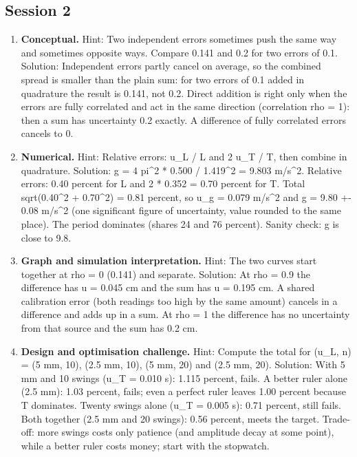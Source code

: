 \documentclass[11pt,a4paper]{article}
\begin{document}
\subsection*{Session 2}
\begin{enumerate}[nosep]
\item \textbf{Conceptual.} Hint: Two independent errors sometimes push the same way and sometimes opposite ways. Compare 0.141 and 0.2 for two errors of 0.1. Solution: Independent errors partly cancel on average, so the combined spread is smaller than the plain sum: for two errors of 0.1 added in quadrature the result is 0.141, not 0.2. Direct addition is right only when the errors are fully correlated and act in the same direction (correlation rho = 1): then a sum has uncertainty 0.2 exactly. A difference of fully correlated errors cancels to 0.
\item \textbf{Numerical.} Hint: Relative errors: u\_L / L and 2 u\_T / T, then combine in quadrature. Solution: g = 4 pi\textasciicircum{}2 * 0.500 / 1.419\textasciicircum{}2 = 9.803 m/s\textasciicircum{}2. Relative errors: 0.40 percent for L and 2 * 0.352 = 0.70 percent for T. Total sqrt(0.40\textasciicircum{}2 + 0.70\textasciicircum{}2) = 0.81 percent, so u\_g = 0.079 m/s\textasciicircum{}2 and g = 9.80 +- 0.08 m/s\textasciicircum{}2 (one significant figure of uncertainty, value rounded to the same place). The period dominates (shares 24 and 76 percent). Sanity check: g is close to 9.8.
\item \textbf{Graph and simulation interpretation.} Hint: The two curves start together at rho = 0 (0.141) and separate. Solution: At rho = 0.9 the difference has u = 0.045 cm and the sum has u = 0.195 cm. A shared calibration error (both readings too high by the same amount) cancels in a difference and adds up in a sum. At rho = 1 the difference has no uncertainty from that source and the sum has 0.2 cm.
\item \textbf{Design and optimisation challenge.} Hint: Compute the total for (u\_L, n) = (5 mm, 10), (2.5 mm, 10), (5 mm, 20) and (2.5 mm, 20). Solution: With 5 mm and 10 swings (u\_T = 0.010 s): 1.115 percent, fails. A better ruler alone (2.5 mm): 1.03 percent, fails; even a perfect ruler leaves 1.00 percent because T dominates. Twenty swings alone (u\_T = 0.005 s): 0.71 percent, still fails. Both together (2.5 mm and 20 swings): 0.56 percent, meets the target. Trade-off: more swings costs only patience (and amplitude decay at some point), while a better ruler costs money; start with the stopwatch.
\end{enumerate}
\end{document}
